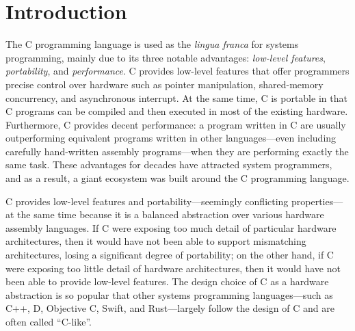 \section{Introduction}
\label{sec:introduction}

The C programming language is used as the \emph{lingua franca} for systems programming, mainly due
to its three notable advantages: \emph{low-level features}, \emph{portability}, and
\emph{performance}.  C provides low-level features that offer programmers precise control over
hardware such as pointer manipulation, shared-memory concurrency, and asynchronous interrupt.  At
the same time, C is portable in that C programs can be compiled and then executed in most of the
existing hardware.  Furthermore, C provides decent performance: a program written in C are usually
outperforming equivalent programs written in other languages---even including carefully hand-written
assembly programs---when they are performing exactly the same task.  These advantages for decades
have attracted system programmers, and as a result, a giant ecosystem was built around the C
programming language.

C provides low-level features and portability---seemingly conflicting properties---at the same time
because it is a balanced abstraction over various hardware assembly languages.  If C were exposing
too much detail of particular hardware architectures, then it would have not been able to support
mismatching architectures, losing a significant degree of portability; on the other hand, if C were
exposing too little detail of hardware architectures, then it would have not been able to provide
low-level features.  The design choice of C as a hardware abstraction is so popular that other
systems programming languages---such as C++, D, Objective C, Swift, and Rust---largely follow the
design of C and are often called ``C-like''.





